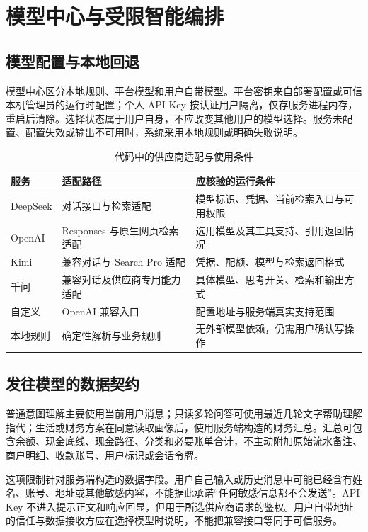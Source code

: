 \sectionstart
\section{模型中心与受限智能编排}
\subsection{模型配置与本地回退}
模型中心区分本地规则、平台模型和用户自带模型。平台密钥来自部署配置或可信本机管理员的运行时配置；个人 API Key 按认证用户隔离，仅存服务进程内存，重启后清除。选择状态属于用户自身，不应改变其他用户的模型选择。服务未配置、配置失效或输出不可用时，系统采用本地规则或明确失败说明。

\begin{table}[htbp]\centering\small
\caption{代码中的供应商适配与使用条件}
\begin{tabularx}{\textwidth}{@{}L{1.8cm}YY@{}}\toprule
服务 & 适配路径 & 应核验的运行条件 \\\midrule
DeepSeek & 对话接口与检索适配 & 模型标识、凭据、当前检索入口与可用权限 \\
OpenAI & Responses 与原生网页检索适配 & 选用模型及其工具支持、引用返回情况 \\
Kimi & 兼容对话与 Search Pro 适配 & 凭据、配额、模型与检索返回格式 \\
千问 & 兼容对话及供应商专用能力适配 & 具体模型、思考开关、检索和输出方式 \\
自定义 & OpenAI 兼容入口 & 配置地址与服务端真实支持范围 \\
本地规则 & 确定性解析与业务规则 & 无外部模型依赖，仍需用户确认写操作 \\\bottomrule
\end{tabularx}
\end{table}

\subsection{发往模型的数据契约}
普通意图理解主要使用当前用户消息；只读多轮问答可使用最近几轮文字帮助理解指代；生活或财务方案在同意读取画像后，使用服务端构造的财务汇总。汇总可包含余额、现金底线、现金路径、分类和必要账单合计，不主动附加原始流水备注、商户明细、收款账号、用户标识或会话令牌。

这项限制针对服务端构造的数据字段。用户自己输入或历史消息中可能已经含有姓名、账号、地址或其他敏感内容，不能据此承诺“任何敏感信息都不会发送”。API Key 不进入提示正文和响应回显，但用于所选供应商请求的鉴权。用户自带地址的信任与数据接收方应在选择模型时说明，不能把兼容接口等同于可信服务。


